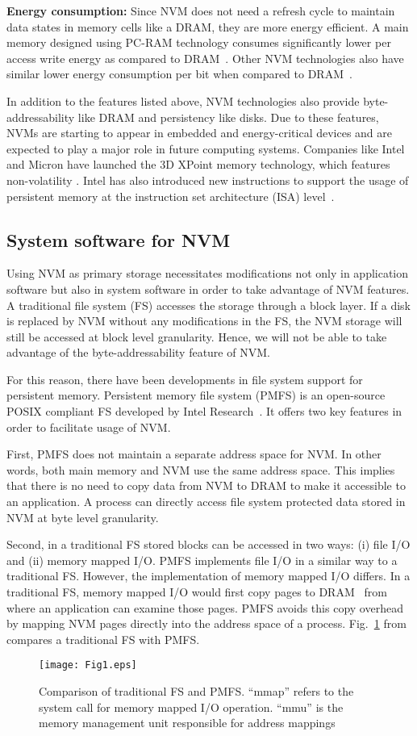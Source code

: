 \noindent\textbf{Energy consumption:} Since NVM does not need a refresh cycle to maintain data states in memory cells like a  DRAM, 
they are more energy efficient. A main memory designed using PC-RAM technology consumes significantly lower per access write energy as compared to DRAM~\cite{zhou2009durable}. Other NVM technologies also have similar lower energy consumption per bit when compared to DRAM~\cite{arulraj2015let,perez2010non}.

In addition to the features listed above, NVM technologies also provide byte-addressability like DRAM and persistency like disks. Due to these features, NVMs are starting to appear in embedded and energy-critical devices and are expected to play a major role in future computing systems. Companies like Intel and Micron have launched the 3D XPoint memory technology, which features non-volatility \cite{3DXPoint}. Intel has also introduced new instructions to support the usage of persistent memory at the instruction set architecture (ISA) level~\cite{intel2016architecture}.

\subsection{System software for NVM}

Using NVM as primary storage necessitates modifications not only in application software but also in system software in order to 
take advantage of NVM features. A traditional file system (FS) accesses the storage through a block layer. If a disk is replaced by NVM without any modifications in
the FS, the NVM storage will still be accessed at block level granularity. Hence, we will not be able to take advantage of the byte-addressability feature of NVM. 

For this reason, there have been developments in file system support for persistent memory. Persistent memory file system (PMFS) is an open-source POSIX compliant FS developed by Intel Research~\cite{dulloor2014system,githubPMFS}. It offers two key features in order to facilitate usage of NVM.

First, PMFS does not maintain a separate address space for NVM. In other words, both main memory and NVM use the same address space. This implies that there is no need to copy data from NVM to DRAM to make it accessible to an application. A process can directly access file system protected data stored in NVM at byte level granularity.


Second, in a traditional FS stored blocks can be accessed in two ways: (i) file I/O and (ii) memory mapped I/O. PMFS implements file I/O in a similar way to a traditional FS. However, the implementation of memory mapped I/O differs. In a traditional FS, memory mapped I/O would first copy pages to DRAM~\cite{dulloor2014system} from where an application can examine those pages. PMFS avoids this copy overhead by mapping NVM pages directly into the address space of a process. 
Fig.~\ref{Fig1} from~\cite{dulloor2014system} compares a traditional FS with PMFS.

\begin{figure}
\centering
\texttt{[image: Fig1.eps]}
\caption{Comparison of traditional FS and PMFS. ``mmap'' refers to the system call for memory mapped I/O operation. 
``mmu'' is the memory management unit responsible for address mappings}
\label{Fig1}
\end{figure}

